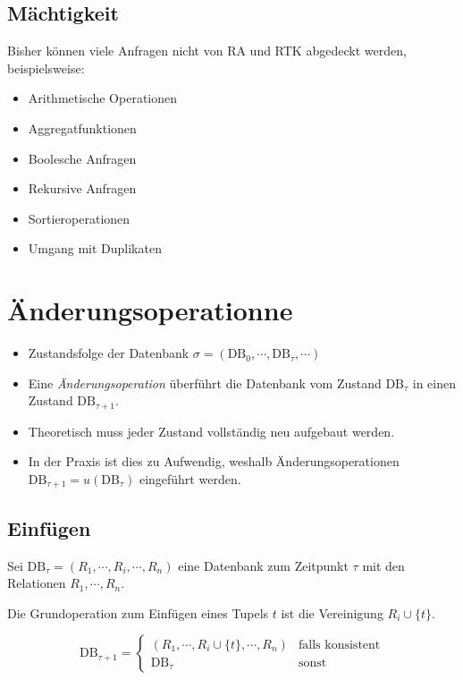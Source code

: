 \documentclass[a4paper, 11pt, accentcolor = tud3b]{tudreport}
\newcommand{\DB}{\text{DB}}
\begin{document}
            \subsection{Mächtigkeit} %
            	Bisher können viele Anfragen nicht von RA und RTK abgedeckt werden, beispielsweise:
            	\begin{itemize}
            		\item Arithmetische Operationen
            		\item Aggregatfunktionen
            		\item Boolesche Anfragen
            		\item Rekursive Anfragen
            		\item Sortieroperationen
            		\item Umgang mit Duplikaten
            	\end{itemize}

        \section{Änderungsoperationne} %
            \begin{itemize}
            	\item Zustandsfolge der Datenbank \( \sigma = (\DB_0, \cdots, \DB_\tau, \cdots) \)
            	\item Eine \textit{Änderungsoperation} überführt die Datenbank vom Zustand \( \DB_\tau \) in einen Zustand \( \DB_{\tau + 1} \).
            	\item Theoretisch muss jeder Zustand vollständig neu aufgebaut werden.
            	\item In der Praxis ist dies zu Aufwendig, weshalb Änderungsoperationen \( \DB_{\tau+1} = u(\DB_\tau) \) eingeführt werden.
            \end{itemize}

            \subsection{Einfügen} %
                Sei \( \DB_\tau = (R_1, \cdots, R_i, \cdots, R_n) \) eine Datenbank zum Zeitpunkt \(\tau\) mit den Relationen \( R_1, \cdots, R_n \).
                
                Die Grundoperation zum Einfügen eines Tupels \( t \) ist die Vereinigung \( R_i \cup \{t\} \).
                
                \begin{equation*}
	                \DB_{\tau + 1} =
	                	\begin{cases*}
		                	(R_1, \cdots, R_i \cup \{t\}, \cdots, R_n) & \text{falls konsistent} \\
		                	\DB_\tau                                   & \text{sonst}
	                	\end{cases*}
                \end{equation*}
\end{document}
